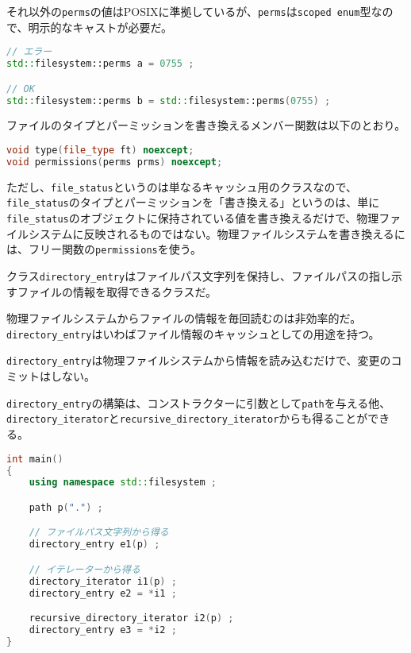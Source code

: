 それ以外の\lstinline!perms!の値はPOSIXに準拠しているが、\lstinline!perms!は\lstinline!scoped enum!型なので、明示的なキャストが必要だ。

\begin{lstlisting}[language=C++]
// エラー
std::filesystem::perms a = 0755 ;

// OK
std::filesystem::perms b = std::filesystem::perms(0755) ;
\end{lstlisting}

ファイルのタイプとパーミッションを書き換えるメンバー関数は以下のとおり。

\begin{lstlisting}[language=C++]
void type(file_type ft) noexcept;
void permissions(perms prms) noexcept;
\end{lstlisting}

ただし、\lstinline!file_status!というのは単なるキャッシュ用のクラスなので、\lstinline!file_status!のタイプとパーミッションを「書き換える」というのは、単に\lstinline!file_status!のオブジェクトに保持されている値を書き換えるだけで、物理ファイルシステムに反映されるものではない。物理ファイルシステムを書き換えるには、フリー関数の\lstinline!permissions!を使う。

%

クラス\lstinline!directory_entry!はファイルパス文字列を保持し、ファイルパスの指し示すファイルの情報を取得できるクラスだ。

物理ファイルシステムからファイルの情報を毎回読むのは非効率的だ。\lstinline!directory_entry!はいわばファイル情報のキャッシュとしての用途を持つ。

\lstinline!directory_entry!は物理ファイルシステムから情報を読み込むだけで、変更のコミットはしない。

\lstinline!directory_entry!の構築は、コンストラクターに引数として\lstinline!path!を与える他、\lstinline!directory_iterator!と\lstinline!recursive_directory_iterator!からも得ることができる。

\begin{lstlisting}[language=C++]
int main()
{
    using namespace std::filesystem ;

    path p(".") ;

    // ファイルパス文字列から得る
    directory_entry e1(p) ;

    // イテレーターから得る
    directory_iterator i1(p) ;
    directory_entry e2 = *i1 ;

    recursive_directory_iterator i2(p) ;
    directory_entry e3 = *i2 ;
}
\end{lstlisting}

